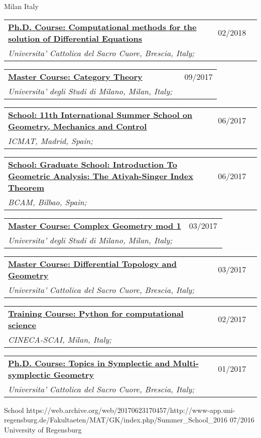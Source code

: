 \documentclass[a4paper]{article}
\newcommand{\longvoice}[8]{
    \begin{tabular}{p{0.83\linewidth} p{0.17\linewidth} }
        \textbf{\href{#3}{#2: #1}} & #4 
        \\ 
        \textit{#5, #6, #7;} & {\small\emph{#8}}
    \end{tabular}
    \vspace{.5em}
}
\begin{document}
        {Milan}
        {Italy}
        {}
    \longvoice{Computational methods for the solution of Differential Equations}
        {Ph.D. Course}
        {https://www.dropbox.com/s/q2rapau2k49n5t7/1802-Course-NumericalPdeAvella.pdf?dl=0}
        {02/2018}
        {Universita' Cattolica del Sacro Cuore}
        {Brescia}
        {Italy}
        {}
    \longvoice{Category Theory}
        {Master Course}
        {https://web.archive.org/web/20190831103757/http://www.mat.unimi.it/users/mantovani/}
        {09/2017}
        {Universita' degli Studi di Milano}
        {Milan}
        {Italy}
        {}
    \longvoice{11th International Summer School on Geometry, Mechanics and Control}
        {School}
        {https://web.archive.org/web/20170623165825/http://gmcnet.webs.ull.es/?q=activity-detaill/1812}
        {06/2017}
        {ICMAT}
        {Madrid}
        {Spain}
        {}
    \longvoice{Graduate School: Introduction To Geometric Analysis: The Atiyah-Singer Index Theorem}
        {School}
        {https://web.archive.org/web/20170623165642/http://www.bcamath.org/es/workshops/bcam-upv-ehu-graduate-school-geometry}
        {06/2017}
        {BCAM}
        {Bilbao}
        {Spain}
        {}
    \longvoice{Complex Geometry mod 1}
        {Master Course}
        {http://www.ccdmat.unimi.it/it/corsiDiStudio/2015/F4Yof1/F4Y-A/F4Y-114/F4Y-114.15.1/programma_it.html}
        {03/2017}
        {Universita' degli Studi di Milano}
        {Milan}
        {Italy}
        {}
    \longvoice{Differential Topology and Geometry}
        {Master Course}
        {http://docenti.unicatt.it/web/html/index.html\#/programmi/BS/2D8B/75017/2017/21065/MGH344/ita}
        {03/2017}
        {Universita' Cattolica del Sacro Cuore}
        {Brescia}
        {Italy}
        {}
    \longvoice{Python for computational science}
        {Training Course}
        {https://web.archive.org/web/20170623170252/https://eventi.cineca.it/en/hpc/python-computational-science}
        {02/2017}
        {CINECA-SCAI}
        {Milan}
        {Italy}
        {}
    \longvoice{Topics in Symplectic and Multi-symplectic Geometry}
        {Ph.D. Course}
        {https://web.archive.org/save/http://scuoledidottorato.unicatt.it/phdschools/science-10545.html}
        {01/2017}
        {Universita' Cattolica del Sacro Cuore}
        {Brescia}
        {Italy}
        {}
        {School}
        {https://web.archive.org/web/20170623170457/http://www-app.uni-regensburg.de/Fakultaeten/MAT/GK/index.php/Summer_School_2016}
        {07/2016}
        {University of Regensburg}
\end{document}
